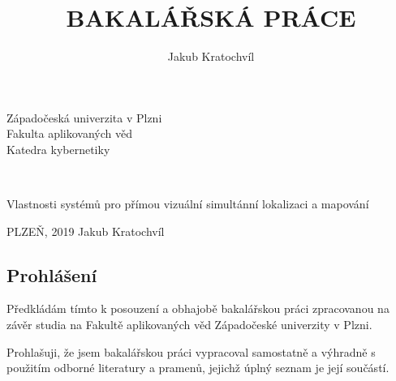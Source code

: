 \documentclass[12pt,a4paper]{report}
\begin{document}
\title{BAKALÁŘSKÁ PRÁCE}
\author{Jakub Kratochvíl}
\begin{titlepage}
\begin{center}
\begin{LARGE}
\vspace*{1cm}
Západočeská univerzita v Plzni \\
Fakulta aplikovaných věd \\
Katedra kybernetiky \\
\end{LARGE}

\vspace{6cm}
\begin{huge}
\textbf{\thetitle}\\
\end{huge}
\vspace{2cm}
\begin{LARGE}
Vlastnosti systémů pro přímou vizuální simultánní lokalizaci a mapování
\end{LARGE}
\end{center}
\vspace{7cm}
\begin{large}
\noindent
PLZEŇ, 2019 \hfill Jakub Kratochvíl

\end{large}

\end{titlepage}
\newpage

\pagestyle{empty}		

\newpage

\newpage
\pagestyle{plain}
\setcounter{page}{1}

\vspace*{1cm}
\subsection*{Prohlášení}

\vspace{2cm}
Předkládám  tímto  k posouzení  a  obhajobě  bakalářskou  práci  zpracovanou  na závěr studia na Fakultě aplikovaných věd Západočeské univerzity v Plzni. \\
\vspace*{0.5cm}

\noindent
Prohlašuji,  že  jsem  bakalářskou  práci  vypracoval  samostatně  a  výhradně s použitím odborné literatury a pramenů, jejichž úplný seznam je její součástí. \\
\end{document}
